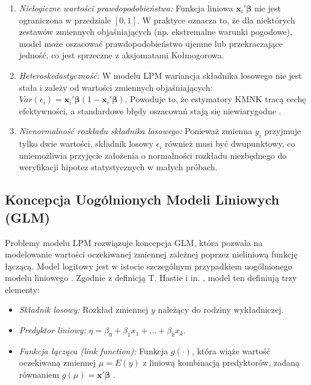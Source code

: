 \begin{enumerate}
    \item \textit{Nielogiczne wartości prawdopodobieństwa:} Funkcja liniowa $\mathbf{x}_i' \boldsymbol{\beta}$ nie jest ograniczona w przedziale $[0, 1]$. W praktyce oznacza to, że dla niektórych zestawów zmiennych objaśniających (np. ekstremalne warunki pogodowe), model może oszacować prawdopodobieństwo ujemne lub przekraczające jedność, co jest sprzeczne z aksjomatami Kołmogorowa.
    \item \textit{Heteroskedastyczność:} W modelu LPM wariancja składnika losowego nie jest stała i zależy od wartości zmiennych objaśniających: $Var(\epsilon_i) = \mathbf{x}_i' \boldsymbol{\beta} (1 - \mathbf{x}_i' \boldsymbol{\beta})$. Powoduje to, że estymatory KMNK tracą cechę efektywności, a standardowe błędy oszacowań stają się niewiarygodne \cite{maddala1983}.
    \item \textit{Nienormalność rozkładu składnika losowego:} Ponieważ zmienna $y_i$ przyjmuje tylko dwie wartości, składnik losowy $\epsilon_i$ również musi być dwupunktowy, co uniemożliwia przyjęcie założenia o normalności rozkładu niezbędnego do weryfikacji hipotez statystycznych w małych próbach.
\end{enumerate}

\subsection{Koncepcja Uogólnionych Modeli Liniowych (GLM)}

Problemy modelu LPM rozwiązuje koncepcja GLM, która pozwala na modelowanie wartości oczekiwanej zmiennej zależnej poprzez nieliniową funkcję łączącą. Model logitowy jest w istocie szczególnym przypadkiem uogólnionego modelu liniowego \cite{jackowska2011}. Zgodnie z definicją T. Hastie i in. \cite{hastie2009}, model ten definiują trzy elementy:

\begin{itemize}
    \item \textit{Składnik losowy:} Rozkład zmiennej $y$ należący do rodziny wykładniczej.
    \item \textit{Predyktor liniowy:} $\eta = \beta_0 + \beta_1 x_1 + \dots + \beta_k x_k$.
    \item \textit{Funkcja łącząca (link function):} Funkcja $g(\cdot)$, która wiąże wartość oczekiwaną zmiennej $\mu = E(y)$ z liniową kombinacją predyktorów, zadaną równaniem $g(\mu) = \mathbf{x}' \boldsymbol{\beta}$ \cite{jackowska2011}.
\end{itemize}

